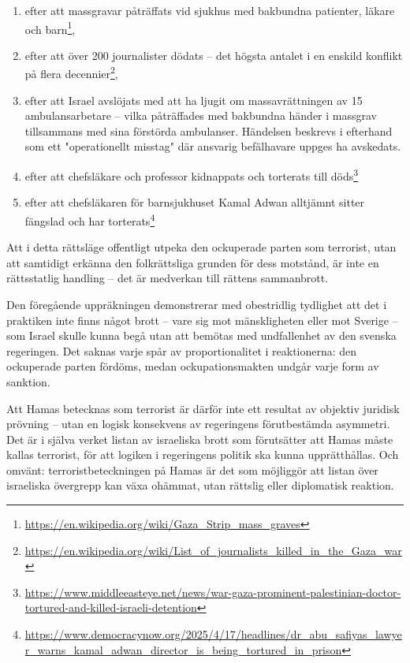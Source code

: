 \documentclass[12pt]{article}
\begin{document}
\begin{enumerate}
\item efter att massgravar påträffats vid sjukhus med bakbundna patienter, läkare och barn\footnote{\url{https://en.wikipedia.org/wiki/Gaza_Strip_mass_graves}},
\item efter att över 200 journalister dödats – det högsta antalet i en enskild konflikt på flera decennier\footnote{\url{https://en.wikipedia.org/wiki/List_of_journalists_killed_in_the_Gaza_war}},
\item efter att Israel avslöjats med att ha ljugit om massavrättningen av 15 ambulansarbetare – vilka påträffades med bakbundna händer i massgrav tillsammans med sina förstörda ambulanser. Händelsen beskrevs i efterhand som ett "operationellt misstag" där ansvarig befälhavare uppges ha avskedats.
\item efter att chefsläkare och professor kidnappats och torterats till döds\footnote{\url{https://www.middleeasteye.net/news/war-gaza-prominent-palestinian-doctor-tortured-and-killed-israeli-detention}}
\item efter att chefsläkaren för barnsjukhuset Kamal Adwan alltjämnt sitter fängslad och har torterats\footnote{\url{https://www.democracynow.org/2025/4/17/headlines/dr_abu_safiyas_lawyer_warns_kamal_adwan_director_is_being_tortured_in_prison}}
\end{enumerate}


Att i detta rättsläge offentligt utpeka den ockuperade parten som terrorist, utan att samtidigt erkänna den folkrättsliga grunden för dess motstånd, är inte en rättsstatlig handling – det är medverkan till rättens sammanbrott.

Den föregående uppräkningen demonstrerar med obestridlig tydlighet att det i praktiken inte finns något brott – vare sig mot mänskligheten eller mot Sverige – som Israel skulle kunna begå utan att bemötas med undfallenhet av den svenska regeringen. Det saknas varje spår av proportionalitet i reaktionerna: den ockuperade parten fördöms, medan ockupationsmakten undgår varje form av sanktion.

Att Hamas betecknas som terrorist är därför inte ett resultat av objektiv juridisk prövning – utan en logisk konsekvens av regeringens förutbestämda asymmetri. Det är i själva verket listan av israeliska brott som förutsätter att Hamas måste kallas terrorist, för att logiken i regeringens politik ska kunna upprätthållas. Och omvänt: terroristbeteckningen på Hamas är det som möjliggör att listan över israeliska övergrepp kan växa ohämmat, utan rättslig eller diplomatisk reaktion.
\end{document}
